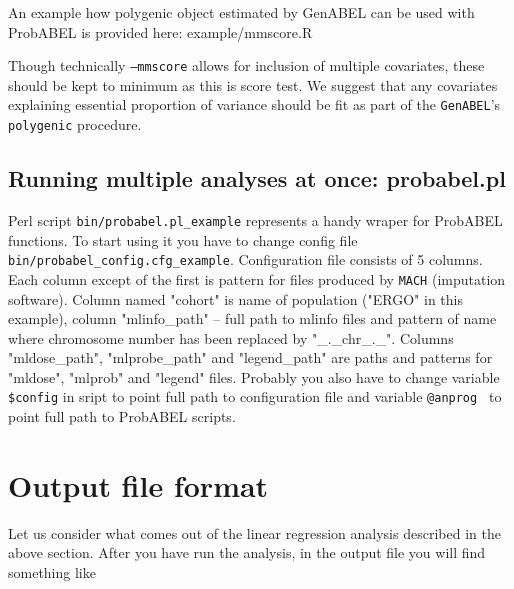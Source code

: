 \documentclass[12pt]{article}
\begin{document}
An example how polygenic object estimated by GenABEL can be used with ProbABEL
is provided here: example/mmscore.R

Though technically \texttt{--mmscore} allows for inclusion of multiple 
covariates, these should be kept to minimum as this is score test. We suggest 
that any covariates explaining essential proportion of variance should be 
fit as part of the \texttt{GenABEL}'s \texttt{polygenic} procedure.


\subsection{Running multiple analyses at once: probabel.pl}

Perl script \texttt{bin/probabel.pl\_example} represents a handy wraper for ProbABEL functions. 
To start using it you have to change config file \\
\texttt{bin/probabel\_config.cfg\_example}.
Configuration file consists of 5 columns. Each column except of the first is pattern for 
files produced by \texttt{MACH} (imputation software). 
Column named "cohort" is name of population ("ERGO" in this example), column "mlinfo\_path" -- 
full path to mlinfo files and pattern of name where chromosome number has been 
replaced by "\_.\_chr\_.\_". Columns "mldose\_path", "mlprobe\_path" and "legend\_path" 
are paths and patterns for "mldose", "mlprob" and "legend" files.
Probably you also have to change variable \texttt{\$config} in sript to point full path to 
configuration file and variable \texttt{@anprog } to point full path to ProbABEL scripts.


\section{Output file format}

Let us consider what comes out of the linear regression analysis 
described in the above section. After you have run the analysis, in 
the output file you will find something like

\begin{small}

\end{small}
\end{document}
